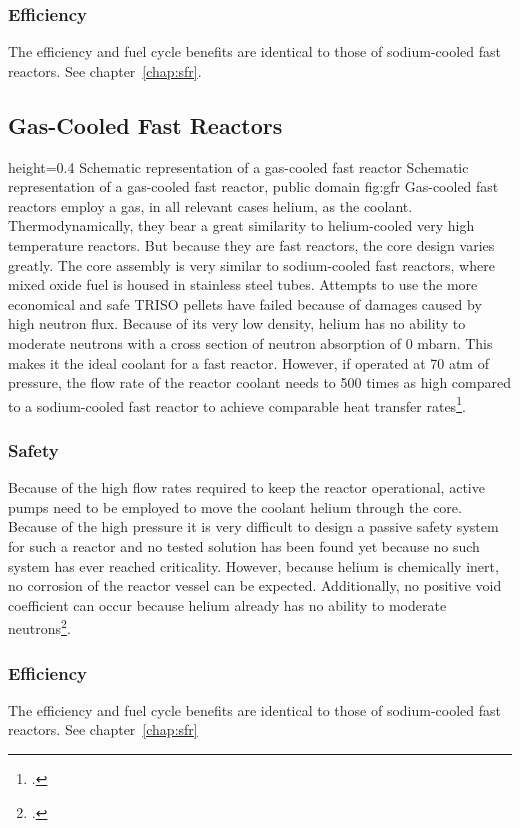 \subsubsection{Efficiency}
The efficiency and fuel cycle benefits are identical to those of sodium-cooled fast reactors. See chapter~\ref{chap:sfr}.
\pagebreak
\subsection{Gas-Cooled Fast Reactors}
    {height=0.4\textheight}
    {Schematic representation of a gas-cooled fast reactor}
    {Schematic representation of a gas-cooled fast reactor, public domain}
    {fig:gfr}
Gas-cooled fast reactors employ a gas, in all relevant cases helium, as the coolant. Thermodynamically,
they bear a great similarity to helium-cooled very high temperature reactors. But because they
are fast reactors, the core design varies greatly. The core assembly is very similar to sodium-cooled
fast reactors, where mixed oxide fuel is housed in stainless steel tubes. Attempts to use the more
economical and safe TRISO pellets have failed because of damages caused by high neutron flux. Because
of its very low density, helium has no ability to moderate neutrons with a cross section of neutron
absorption of 0 mbarn. This makes it the ideal coolant for a fast reactor. However, if operated at
70 atm of pressure, the flow rate of the reactor coolant needs to 500 times as high compared to a
sodium-cooled fast reactor to achieve comparable heat transfer rates\footcite[135-144]{T4Gen}.
\subsubsection{Safety}
Because of the high flow rates required to keep the reactor operational, active pumps need to be employed
to move the coolant helium through the core. Because of the high pressure it is very difficult to design
a passive safety system for such a reactor and no tested solution has been found yet because no such
system has ever reached criticality. However, because helium is chemically inert, no corrosion of the
reactor vessel can be expected. Additionally, no positive void coefficient can occur because helium
already has no ability to moderate neutrons\footcite[135-144]{T4Gen}.
\subsubsection{Efficiency}
The efficiency and fuel cycle benefits are identical to those of sodium-cooled fast reactors. See chapter~\ref{chap:sfr}
\pagebreak

